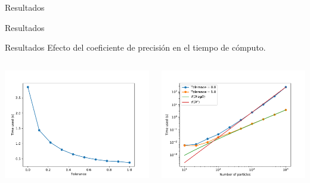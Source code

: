 \documentclass[handout]{beamer}
\begin{document}
\begin{frame}{Resultados}
	\centering
	\\
\end{frame}
\begin{frame}{Resultados}
	\centering
	\\
\end{frame}
\begin{frame}{Resultados}
	Efecto del coeficiente de precisi\'on en el tiempo de c\'omputo.
	\begin{columns}
		\begin{column}{0.5\textwidth}
			\includegraphics[width=\linewidth]{sources/images/Tolerance_results.pdf}
		\end{column}
		\begin{column}{0.5\textwidth}
			\includegraphics[width=\linewidth]{sources/images/Particles_results.pdf}
		\end{column}
	\end{columns}
\end{frame}
\end{document}

